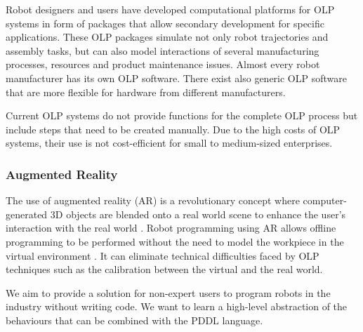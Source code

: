 Robot designers and users have developed computational platforms for OLP systems in form of packages that allow secondary development for specific applications. 
These OLP packages simulate not only robot trajectories and assembly tasks, but can also model interactions of several manufacturing processes, resources and product maintenance issues. 
Almost every robot manufacturer has its own OLP software. 
There exist also generic OLP software that are more flexible for hardware from different manufacturers.

Current OLP systems do not provide functions for the complete OLP process but include steps that need to be created manually. 
Due to the high costs of OLP systems, their use is not cost-efficient for small to medium-sized enterprises.

\subsubsection{Augmented Reality}\label{sssec:Augmented Reality}
The use of augmented reality (AR) is a revolutionary concept where computer-generated 3D objects are blended onto a real world scene to enhance the user's interaction with the real world \cite{pettersen2003augmented}. 
Robot programming using AR allows offline programming to be performed without the need to model the workpiece in the virtual environment \cite{pan2012recent}. 
It can eliminate technical difficulties faced by OLP techniques such as the calibration between the virtual and the real world.

We aim to provide a solution for non-expert users to program robots in the industry without writing code. 
We want to learn a high-level abstraction of the behaviours that can be combined with the PDDL language.